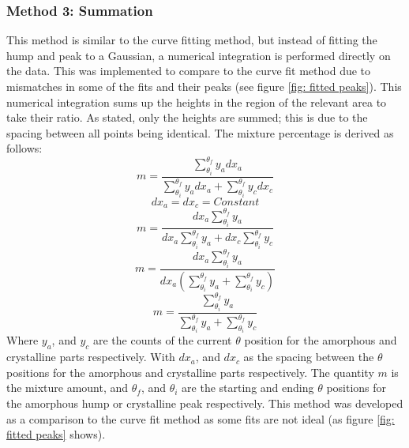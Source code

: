     \subsubsection*{Method 3: Summation}

        This method is similar to the curve fitting method, but instead of fitting the hump and peak to a Gaussian, a numerical integration is performed directly on the data.
        This was implemented to compare to the curve fit method due to mismatches in some of the fits and their peaks (see figure \ref{fig: fitted peaks}). 
        This numerical integration sums up the heights in the region of the relevant area to take their ratio.
        As stated, only the heights are summed; this is due to the spacing between all points being identical.
        The mixture percentage is derived as follows:
        $$m=\frac{\sum_{\theta_i}^{\theta_f}y_adx_a}{\sum_{\theta_i}^{\theta_f}y_adx_a+\sum_{\theta_i}^{\theta_f}y_cdx_c}$$
        $$dx_a=dx_c=Constant$$
        $$m=\frac{dx_a\sum_{\theta_i}^{\theta_f}y_a}{dx_a\sum_{\theta_i}^{\theta_f}y_a+dx_c\sum_{\theta_i}^{\theta_f}y_c}$$
        $$m=\frac{dx_a\sum_{\theta_i}^{\theta_f}y_a}{dx_a\left(\sum_{\theta_i}^{\theta_f}y_a+\sum_{\theta_i}^{\theta_f}y_c\right)}$$
        \begin{equation}
            m=\frac{\sum_{\theta_i}^{\theta_f}y_a}{\sum_{\theta_i}^{\theta_f}y_a+\sum_{\theta_i}^{\theta_f}y_c}
            \label{eq: summation}
        \end{equation}
        Where $y_a$, and $y_c$ are the counts of the current $\theta$ position for the amorphous and crystalline parts respectively.
        With $dx_a$, and $dx_c$ as the spacing between the $\theta$ positions for the amorphous and crystalline parts respectively.
        The quantity $m$ is the mixture amount, and $\theta_f$, and $\theta_i$ are the starting and ending $\theta$ positions for the amorphous hump or crystalline peak respectively. 
        This method was developed as a comparison to the curve fit method as some fits are not ideal (as figure \ref{fig: fitted peaks} shows). 


